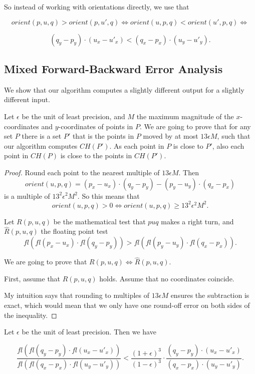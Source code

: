 So instead of working with orientations directly, we use that

$$orient(p, u, q) > orient(p, u', q) \iff orient(u, p, q) < orient(u', p, q) 
\iff$$

$$(q_y - p_y) \cdot (u_x - u'_x) < (q_x - p_x) \cdot (u_y - u'_y).$$

\subsection{Mixed Forward-Backward Error Analysis}

We show that our algorithm computes a slightly different output for a slightly
different input.

Let $\epsilon$ be the unit of least precision, and $M$ the maximum magnitude
of the $x$-coordinates and $y$-coordinates of points in $P$.
We are going to prove that for any set $P$ there is a set $P'$ that is the
points in $P$ moved by at most $13 \epsilon M$, such that our algorithm
computes $CH(P')$. As each point in $P$ is close to $P'$, also each point in
$CH(P)$ is close to the points in $CH(P')$.

\begin{proof}
    Round each point to the nearest multiple of $13 \epsilon M$. Then
    $$orient(u, p, q) = (p_x - u_x) \cdot (q_y - p_y) - 
    (p_y - u_y) \cdot (q_x - p_x)$$
    is a multiple of $13^2 \epsilon^2 M^2$. So this means that 
    $$orient(u, p, q) > 0 \iff orient(u, p, q) \geq 13^2 \epsilon^2 M^2.$$

    Let $R(p, u, q)$ be the mathematical test that $puq$ makes a right turn, 
    and $\hat{R}(p, u, q)$ the floating point test
    $$fl(fl(p_x - u_x) \cdot fl(q_y - p_y)) > fl(fl(p_y - u_y) \cdot fl(q_x - p_x)).$$

    We are going to prove that $R(p, u, q) \iff \hat{R}(p, u, q)$.

    First, assume that $R(p, u, q)$ holds. Assume that no coordinates coincide.

    My intuition says that rounding to multiples of $13 \epsilon M$ ensures
    the subtraction is exact, which would mean that we only have one round-off
    error on both sides of the inequality.
\end{proof}


\iffalse

Let $\epsilon$ be the unit of least precision. Then we have

$$\frac{fl(fl(q_y - p_y) \cdot fl(u_x - u'_x))}{fl(fl(q_x - p_x) \cdot fl(u_y - u'_y))} 
< \frac{(1 + \epsilon)^3}{(1 - \epsilon)^3} \cdot \frac{(q_y - p_y) \cdot (u_x - u'_x)}{(q_x - p_x) \cdot (u_y - u'_y)}.$$

